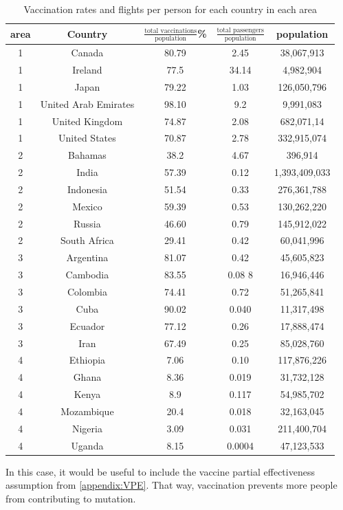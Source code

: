 \documentclass{article}
\begin{document}
\begin{table}[!ht]
    \centering
    \begin{tabular}{|c|c|c|c|c|}
    \hline
         area & Country & $\frac{\text{total vaccinations}}{\text{population}}$\%  & $\frac{\text{total passengers}}{\text{population}}$ & population \\
         \hline
1 & Canada & 80.79 & 2.45 & 38,067,913 \\
1 & Ireland & 77.5 & 34.14 & 4,982,904 \\
1 & Japan & 79.22 & 1.03 & 126,050,796 \\
1 & United Arab Emirates & 98.10  & 9.2 & 9,991,083 \\
1 & United Kingdom& 74.87 & 2.08 & 682,071,14  \\
1 & United States & 70.87 & 2.78 & 332,915,074 \\
\hline
2 & Bahamas & 38.2 & 4.67 & 396,914 \\
2 & India & 57.39 & 0.12  & 1,393,409,033 \\
2 & Indonesia & 51.54 & 0.33  & 276,361,788 \\
2 & Mexico & 59.39 & 0.53  & 130,262,220 \\
2 & Russia & 46.60 & 0.79  & 145,912,022 \\
2 & South Africa & 29.41 & 0.42  & 60,041,996 \\
\hline
3 & Argentina & 81.07 & 0.42  & 45,605,823 \\
3 & Cambodia & 83.55 & 0.08 8 & 16,946,446 \\
3 & Colombia & 74.41 & 0.72  & 51,265,841 \\
3 & Cuba & 90.02 & 0.040 & 11,317,498 \\
3 & Ecuador & 77.12 & 0.26  & 17,888,474 \\
3 & Iran & 67.49 & 0.25  & 85,028,760 \\
\hline
4 & Ethiopia & 7.06 & 0.10  & 117,876,226 \\
4 & Ghana & 8.36 & 0.019 & 31,732,128 \\
4 & Kenya & 8.9 & 0.117  & 54,985,702 \\
4 & Mozambique & 20.4 & 0.018 & 32,163,045 \\
4 & Nigeria & 3.09 & 0.031 & 211,400,704 \\
4 & Uganda & 8.15 & 0.0004 & 47,123,533 \\
\hline


    \end{tabular}
    \caption{Vaccination rates and flights per person for each country in each area}
    \label{tab:vax}
\end{table}
In this case, it would be useful to include the vaccine partial effectiveness assumption from \ref{appendix:VPE}. That way, vaccination prevents more people from contributing to mutation. 
\end{document}
